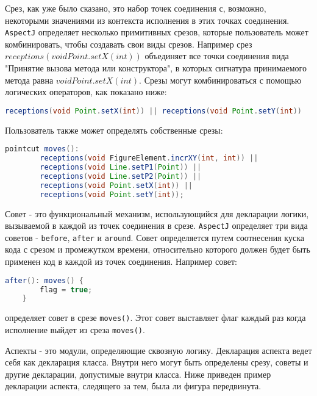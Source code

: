Срез, как уже было сказано, это набор точек соединения с, возможно, некоторыми значениями из контекста исполнения в этих точках соединения. \texttt{AspectJ} определяет несколько примитивных срезов, которые пользователь может комбинировать, чтобы создавать свои виды срезов. Например срез $receptions(void Point.setX(int))$ объединяет все точки соединения вида "Принятие вызова метода или конструктора", в которых сигнатура принимаемого метода равна $void Point.setX(int)$. Срезы могут комбинироваться с помощью логических операторов, как показано ниже:

\begin{lstlisting}[language=Java, caption={Срез, следящий за координатой точки \texttt{x} или \texttt{y}.}]
    receptions(void Point.setX(int)) || receptions(void Point.setY(int))
\end{lstlisting}

Пользователь также может определять собственные срезы:

\begin{lstlisting}[language=Java, caption={Пользовательский срез, следящий за координатой точки \texttt{x} или \texttt{y}.}]
    pointcut moves():
        receptions(void FigureElement.incrXY(int, int)) ||
        receptions(void Line.setP1(Point)) ||
        receptions(void Line.setP2(Point)) ||
        receptions(void Point.setX(int)) ||
        receptions(void Point.setY(int));
\end{lstlisting}

Совет - это функциональный механизм, использующийся для декларации логики, вызываемой в каждой из точек соединения в срезе. \texttt{AspectJ} определяет три вида советов - \texttt{before}, \texttt{after} и \texttt{around}. Совет определяется путем соотнесения куска кода с срезом и промежутком времени, относительно которого должен будет быть применен код в каждой из точек соединения. Например совет:

\begin{lstlisting}[language=Java, caption={Совет, отмечающий изменения точки \texttt{x} или \texttt{y}.}]
    after(): moves() {
        flag = true;
    }
\end{lstlisting}

определяет совет в срезе \texttt{moves()}. Этот совет выставляет флаг каждый раз когда исполнение выйдет из среза \texttt{moves()}.

Аспекты - это модули, определяющие сквозную логику. Декларация аспекта ведет себя как декларация класса. Внутри него могут быть определены срезу, советы и другие декларации, допустимые внутри класса. Ниже приведен пример декларации аспекта, следящего за тем, была ли фигура передвинута.

